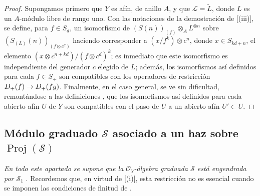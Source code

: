 \documentclass[oneside,10pt]{amsart}
\makeatletter
\newcommand{\ega@arrow}[2]{\mathchoice{#1}{#2}{#2}{#2}}
\renewcommand{\to}{\ega@arrow{\longrightarrow}{\rightarrow}}
\let\EGAOriginalLabel\label
\renewcommand{\label}[1]{\phantomsection\EGAOriginalLabel{#1}}
\makeatother
\begin{document}
\begin{proof}
Supongamos primero que $Y$ es afín, de anillo $A$, y que $\mathcal{L}=\widetilde{L}$, donde $L$ es un $A$-módulo libre de rango uno.
Con las notaciones de la demostración de [(iii)], se define, para $f\in S_d$, un isomorfismo de $(S(n))_{(f)}\otimes_A L^{\otimes n}$ sobre $(S_{(L)}(n))_{(f\otimes c^d)}$ haciendo corresponder a $(x/f^k)\otimes c^n$, donde $x\in S_{kd+n}$, el elemento $(x\otimes c^{n+kd})/(f\otimes c^d)^k$; es inmediato que este isomorfismo es independiente del generador $c$ elegido de $L$; además, los isomorfismos así definidos para cada $f\in S_+$ son compatibles con los operadores de restricción $D_+(f)\to D_+(fg)$.
Finalmente, en el caso general, se ve sin dificultad, remontándose a las definiciones , que los isomorfismos así definidos para cada abierto afín $U$ de $Y$ son compatibles con el paso de $U$ a un abierto afín $U'\subset U$.
\end{proof}

\subsection{Módulo graduado $\mathcal{S}$ asociado a un haz sobre $\operatorname{Proj}(\mathcal{S})$}
\label{subsection:II.3.3-fr}

\emph{En todo este apartado se supone que la $\mathcal{O}_Y$-álgebra graduada $\mathcal{S}$ está engendrada por $\mathcal{S}_1$} .
Recordemos que, en virtud de [(i)], esta restricción no es esencial cuando se imponen las condiciones de finitud de .
\end{document}
